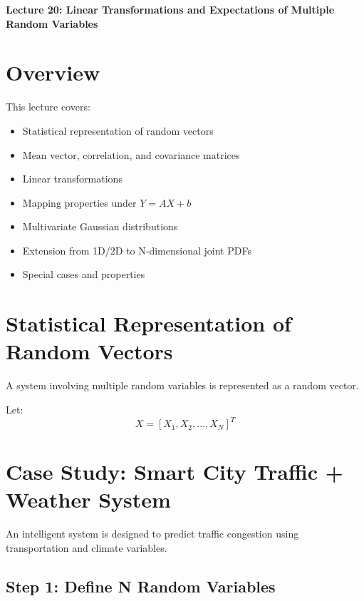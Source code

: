 \documentclass[11pt]{article}
\begin{document}
\begin{center}
    {\Large \textbf{Lecture 20: Linear Transformations and Expectations of Multiple Random Variables}}
\end{center}

\vspace{0.5cm}

\section{Overview}

This lecture covers:
\begin{itemize}
    \item Statistical representation of random vectors
    \item Mean vector, correlation, and covariance matrices
    \item Linear transformations
    \item Mapping properties under $Y = AX + b$
    \item Multivariate Gaussian distributions
    \item Extension from 1D/2D to N-dimensional joint PDFs
    \item Special cases and properties
\end{itemize}

\section{Statistical Representation of Random Vectors}

A system involving multiple random variables is represented as a random vector.

Let:
\[
X = [X_1, X_2, \dots, X_N]^T
\]

\section{Case Study: Smart City Traffic + Weather System}

An intelligent system is designed to predict traffic congestion using transportation and climate variables.

\subsection*{Step 1: Define N Random Variables}
\end{document}

